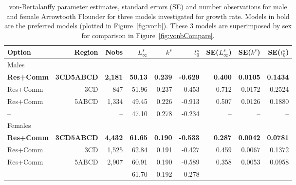 \begin{table}[b]
\centering
\caption{\label{tab:vonbEst} von-Bertalanffy parameter estimates, standard errors (SE) and number observations for male and female Arrowtooth Flounder for three models investigated for growth rate. Models in bold are the preferred models (plotted in Figure~\ref{fig:vonb}). These 3 models are superimposed by sex for comparison in Figure~\ref{fig:vonbCompare}.}
\begin{tabular}{lrrrrrrrr}
\hline
Option & Region & Nobs & $L_{\infty}^s$ & $k^s$ & $t_0^s$ & SE($L_{\infty}^s$) & SE($k^s$) & SE($t_0^s$) \\
\hline
Males \\
\textbf{Res+Comm} & \textbf{3CD5ABCD} & \textbf{2,181} & \textbf{50.13} & \textbf{0.239} & \textbf{-0.629} & \textbf{0.400} & \textbf{0.0105} & \textbf{0.1434} \\
Res+Comm & 3CD              & 847   & 51.96 & 0.237 & -0.453 & 0.712 & 0.0172 & 0.2524 \\
Res+Comm & 5ABCD            & 1,334 & 49.45 & 0.226 & -0.913 & 0.507 & 0.0126 & 0.1880 \\
 --      & \citet{arf2001}  & --    & 47.10 & 0.278 & -0.234 &    -- & --     & -- \\
Females \\
\textbf{Res+Comm} & \textbf{3CD5ABCD} & \textbf{4,432} & \textbf{61.65} & \textbf{0.190} & \textbf{-0.533} & \textbf{0.287} & \textbf{0.0042} & \textbf{0.0781} \\
Res+Comm & 3CD              & 1,525 & 62.84 & 0.191 & -0.427 & 0.459 & 0.0067 & 0.1372 \\
Res+Comm & 5ABCD            & 2,907 & 60.91 & 0.190 & -0.589 & 0.358 & 0.0053 & 0.0958 \\
 --      & \citet{arf2001}  & --    & 61.70 & 0.192 & -0.278 & --    & --     & -- \\
\hline
\end{tabular}
\end{table}

